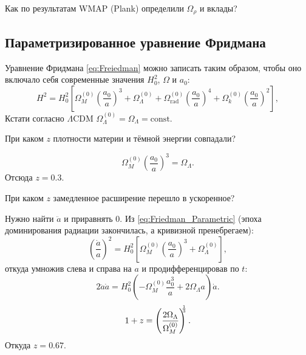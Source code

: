 \documentclass[]{article}
\begin{document}
\begin{tcolorbox}
	Как по результатам WMAP (Plank) определили $\Omega_{\rho}$ и вклады?
\end{tcolorbox}


\subsection{Параметризированное уравнение Фридмана}

Уравнение Фридмана \eqref{eq:Freiedman} можно записать таким образом, чтобы оно включало себя современные значения $H_{0}^2$, $\Omega$ и $a_0$:
\begin{equation}\label{eq:Friedman_Parametric}
	H^2 = H_0^2\left[ \Omega_{M}^{(0)} \left( \frac{a_0}{a}\right)^3 + \Omega_{\Lambda}^{(0)} + \Omega_\text{rad}^{(0)}\left( \frac{a_0}{a}\right)^4 + \Omega_{k}^{(0)} \left( \frac{a_0}{a}\right)^2  \right],
\end{equation}
Кстати согласно $\Lambda\mathrm{CDM}$ $\Omega_{\Lambda}^{(0)} = \Omega_{\Lambda} = \mathrm{const}$.

\begin{tcolorbox}
	При каком $z$ плотности материи и тёмной энергии совпадали?
\end{tcolorbox}
\begin{equation*}\label{}
	\Omega_{M}^{(0)} \left( \frac{a_0}{a}\right)^3 = \Omega_{\Lambda}.
\end{equation*}
Отсюда $z = 0.3$.
\begin{tcolorbox}
	При каком $z$ замедленное расширение перешло в ускоренное?
\end{tcolorbox}
Нужно найти $\ddot{a}$ и приравнять 0.
Из \eqref{eq:Friedman_Parametric} (эпоха доминирования радиации закончилась, а кривизной пренебрегаем):
\begin{equation*}
	\left( \frac{\dot{a}}{a}\right)^2 = H_0^2\left[ \Omega_{M}^{(0)} \left( \frac{a_0}{a}\right)^3 + \Omega_{\Lambda}^{(0)} \right],
\end{equation*}
откуда умножив слева и справа на $a$ и продифференцировав по $t$:
\begin{equation*}
	2\ddot{a}\dot{a} = H_0^2\left( -\Omega_{M}^{(0)}  \frac{a_0^3}{a}  + 2\Omega_{\Lambda} a \right) \dot{a}.
\end{equation*}
\begin{equation*}
	1+ z = \left( \frac{2\Omega_{\Lambda}}{\Omega_{M}^{(0)}}\right)^{\kern-5pt\frac13}.
\end{equation*}
Откуда $z = 0.67$.
\end{document}
